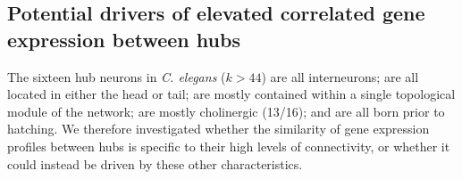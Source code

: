 \documentclass[10pt,letterpaper]{article}
\begin{document}
\subsection*{Potential drivers of elevated correlated gene expression between hubs}
The sixteen hub neurons in \emph{C. elegans} ($k > 44$)
are all interneurons;
are all located in either the head or tail;
are mostly contained within a single topological module of the network;
are mostly cholinergic (13/16);
and are all born prior to hatching.
We therefore investigated whether the similarity of gene expression profiles between hubs is specific to their high levels of connectivity, or whether it could instead be driven by these other characteristics.


\end{document}
